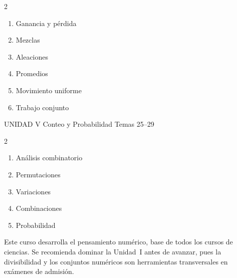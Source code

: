 \begin{multicols}{2}
  \begin{enumerate}[label=\textcolor{AzulMedio}{\textbf{\arabic*.}},
      leftmargin=2em, itemsep=1pt, start=19]
    \item Ganancia y pérdida
    \item Mezclas
    \item Aleaciones
    \item Promedios
    \item Movimiento uniforme
    \item Trabajo conjunto
  \end{enumerate}
\end{multicols}

\vspace{0.4cm}

\begin{tcolorbox}[enhanced, colback=AzulPizarra, colframe=DoradoAcadémico,
    arc=3pt, boxrule=1pt, left=8pt, right=8pt, top=5pt, bottom=5pt,
    fontupper=\sffamily\bfseries\color{white}]
  UNIDAD V \hfill Conteo y Probabilidad \hfill Temas 25–29
\end{tcolorbox}

\begin{multicols}{2}
  \begin{enumerate}[label=\textcolor{AzulPizarra}{\textbf{\arabic*.}},
      leftmargin=2em, itemsep=1pt, start=25]
    \item Análisis combinatorio
    \item Permutaciones
    \item Variaciones
    \item Combinaciones
    \item Probabilidad
  \end{enumerate}
\end{multicols}

\vspace{0.6cm}

\begin{cajatip}
  Este curso desarrolla el pensamiento numérico, base de todos los cursos de
  ciencias. Se recomienda dominar la Unidad~I antes de avanzar, pues la
  divisibilidad y los conjuntos numéricos son herramientas transversales en
  exámenes de admisión.
\end{cajatip}

\newpage